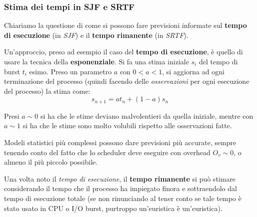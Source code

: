 \documentclass[a4paper,11pt]{article}
\begin{document}
\subsubsection{Stima dei tempi in SJF e SRTF}
Chiariamo la questione di come si possono fare previsioni informate sul \textbf{tempo di esecuzione} (in \textit{SJF}) e il \textbf{tempo rimanente} (in \textit{SRTF}).

Un'approccio, preso ad esempio il caso del \textbf{tempo di esecuzione}, è quello di usare la tecnica della \textbf{esponenziale}.
Si fa una stima iniziale $s_i$ del tempo di burst $t_i$ esimo.
Preso un parametro $a$ con $0 < a < 1$, si aggiorna ad ogni terminazione del processo (quindi facendo delle \textit{osservazioni} per ogni esecuzione del processo) la stima come:
$$
s_{n + 1} = a t_n + (1 - a) s_n
$$

Presi $a \sim 0$ si ha che le stime deviano malvolentieri da quella iniziale, mentre con $a \sim 1$ si ha che le stime sono molto volubili rispetto alle osservazioni fatte. 

Modeli statistici più complessi possono dare previsioni più accurate, sempre tenendo conto del fatto che lo scheduler deve eseguire con overhead $O_v \sim 0$, o almeno il più piccolo possibile.

Una volta noto il \textit{tempo di esecuzione}, il \textbf{tempo rimanente} si può stimare considerando il tempo che il processo ha impiegato finora e sottraendolo dal tempo di esecuzione totale (se non rinunciando al tener conto se tale tempo è stato usato in CPU o I/O burst, purtroppo un'euristica è un'euristica).
\end{document}
